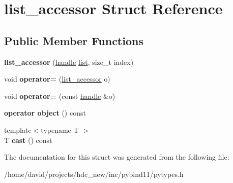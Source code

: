 \hypertarget{structlist__accessor}{}\section{list\+\_\+accessor Struct Reference}
\label{structlist__accessor}
\subsection*{Public Member Functions}
\begin{DoxyCompactItemize}
\item 
{\bfseries list\+\_\+accessor} (\hyperlink{classhandle}{handle} \hyperlink{classlist}{list}, size\+\_\+t index)\hypertarget{structlist__accessor_a0fec188feb31249d851bec7829889510}{}\label{structlist__accessor_a0fec188feb31249d851bec7829889510}

\item 
void {\bfseries operator=} (\hyperlink{structlist__accessor}{list\+\_\+accessor} o)\hypertarget{structlist__accessor_a458418e4e1ae504513710f9ed7614356}{}\label{structlist__accessor_a458418e4e1ae504513710f9ed7614356}

\item 
void {\bfseries operator=} (const \hyperlink{classhandle}{handle} \&o)\hypertarget{structlist__accessor_ad2838a86cb9139077c778169adc11f3d}{}\label{structlist__accessor_ad2838a86cb9139077c778169adc11f3d}

\item 
{\bfseries operator object} () const \hypertarget{structlist__accessor_aea6becffed753752f02e40c83194f154}{}\label{structlist__accessor_aea6becffed753752f02e40c83194f154}

\item 
{\footnotesize template$<$typename T $>$ }\\T {\bfseries cast} () const \hypertarget{structlist__accessor_a71737235dde54b778b905eefa6040342}{}\label{structlist__accessor_a71737235dde54b778b905eefa6040342}

\end{DoxyCompactItemize}


The documentation for this struct was generated from the following file\+:\begin{DoxyCompactItemize}
\item 
/home/david/projects/hdc\+\_\+new/inc/pybind11/pytypes.\+h\end{DoxyCompactItemize}
